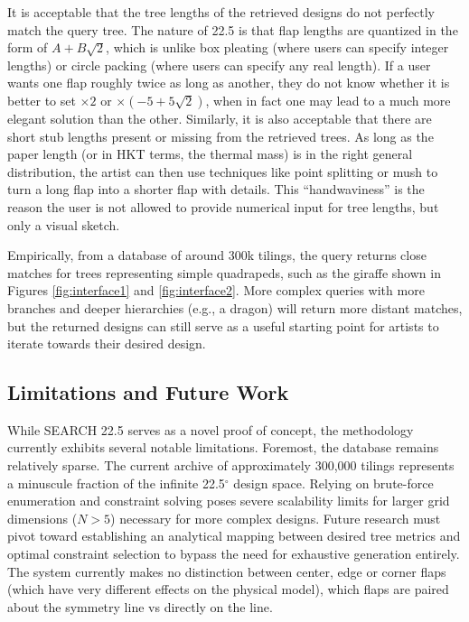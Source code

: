 \documentclass[11pt]{article}
\begin{document}
It is acceptable that the tree lengths of the retrieved designs do not perfectly match the query tree. The nature of 22.5 is that flap lengths are quantized in the form of $A + B\sqrt{2}$, which is unlike box pleating (where users can specify integer lengths) or circle packing (where users can specify any real length). If a user wants one flap roughly twice as long as another, they do not know whether it is better to set $\times 2$ or $\times (-5 + 5\sqrt{2})$, when in fact one may lead to a much more elegant solution than the other. Similarly, it is also acceptable that there are short stub lengths present or missing from the retrieved trees. As long as the paper length (or in HKT terms, the thermal mass) is in the right general distribution, the artist can then use techniques like point splitting or mush to turn a long flap into a shorter flap with details. This ``handwaviness'' is the reason the user is not allowed to provide numerical input for tree lengths, but only a visual sketch.

Empirically, from a database of around 300k tilings, the query returns close matches for trees representing simple quadrapeds, such as the giraffe shown in Figures \ref{fig:interface1} and \ref{fig:interface2}. More complex queries with more branches and deeper hierarchies (e.g., a dragon) will return more distant matches, but the returned designs can still serve as a useful starting point for artists to iterate towards their desired design.


\subsection{Limitations and Future Work}
While SEARCH 22.5 serves as a novel proof of concept, the methodology currently exhibits several notable limitations. Foremost, the database remains relatively sparse. The current archive of approximately 300,000 tilings represents a minuscule fraction of the infinite 22.5$^\circ$ design space. Relying on brute-force enumeration and constraint solving poses severe scalability limits for larger grid dimensions ($N > 5$) necessary for more complex designs. Future research must pivot toward establishing an analytical mapping between desired tree metrics and optimal constraint selection to bypass the need for exhaustive generation entirely. The system currently makes no distinction between center, edge or corner flaps (which have very different effects on the physical model), which flaps are paired about the symmetry line vs directly on the line.
\end{document}
